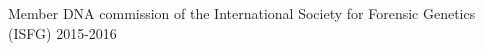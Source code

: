 

\begin{cvhonors}

  \cvhonor
    {Member} %
    {DNA commission of the International Society for Forensic Genetics (ISFG)} %
    {} %
    {2015-2016} %

\end{cvhonors}
